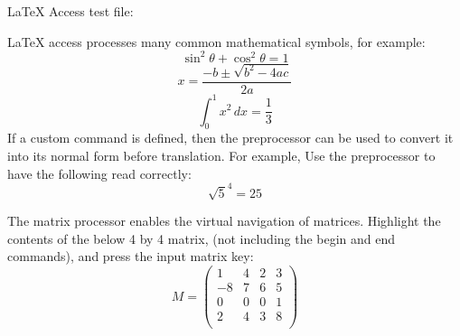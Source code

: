 \documentclass[12pt]{article}
\newcommand{\Srf}{\sqrt{5}}
\begin{document}
LaTeX Access  test file:

LaTeX access processes many common mathematical symbols, for
example:
$$\sin^2\theta+\cos^2\theta=1$$
$$x=\frac{-b\pm\sqrt{b^2-4ac}}{2a}$$
$$\int_0^1 x^2\,dx=\frac{1}{3}$$
If a custom command is defined, then the preprocessor can be used to
convert it into its normal form before translation.  For example,
Use the preprocessor to have the following read correctly:
$$\Srf^4=25$$

The matrix processor enables the virtual navigation of matrices.
Highlight the contents of the below 4 by 4 matrix, (not including
the begin and end commands), and press the input matrix key:
$$M=\begin{pmatrix}
1 & 4 & 2 & 3\\
-8 & 7 & 6 & 5\\
0 & 0 & 0 & 1\\
2 & 4 & 3 & 8\\
\end{pmatrix}$$
\end{document}
